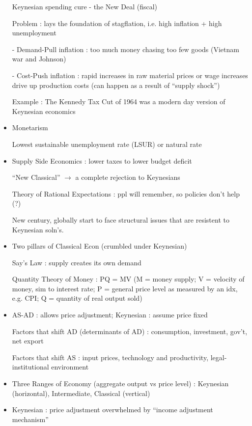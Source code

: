 \documentclass{article}
\begin{document}
\begin{itemize}
	Keynesian spending cure - the New Deal (fiscal)

	Problem : lays the foundation of {\color{red} stagflation}, i.e. high inflation + high unemployment

	- Demand-Pull inflation : too much money chasing too few goods (Vietnam war and Johnson)

	- Cost-Push inflation : rapid increases in raw material prices or wage increases drive up production costs (can happen as a result of ``supply shock'')

	Example : The Kennedy Tax Cut of 1964 was a modern day version of Keynesian economics


	\item Monetarism

	Lowest sustainable unemployment rate (LSUR) or natural rate


	\item Supply Side Economics : lower taxes to lower budget deficit

	``New Classical'' $\rightarrow$ a complete rejection to Keynesians

	Theory of Rational Expectations : ppl will remember, so policies don't help (?)

	New century, globally start to face structural issues that are resistent to Keynesian soln's.

\end{itemize}




\begin{itemize}
\item Two pillars of Classical Econ (crumbled under Keynesian)

Say's Law : supply creates its own demand

Quantity Theory of Money : PQ = MV (M = money supply; V = velocity of money, sim to interest rate; P = general price level as measured by an idx, e.g. CPI; Q = quantity of real output sold)

\item AS-AD : allows price adjustment; Keynesian : assume price fixed

Factors that shift AD (determinants of AD) : consumption, investment, gov't, net export

Factors that shift AS : input prices, technology and productivity, legal-institutional environment

\item Three Ranges of Economy (aggregate output vs price level) : Keynesian (horizontal), Intermediate, Classical (vertical)

\item Keynesian : price adjustment overwhelmed by ``income adjustment mechanism''
\end{itemize}
\end{document}
